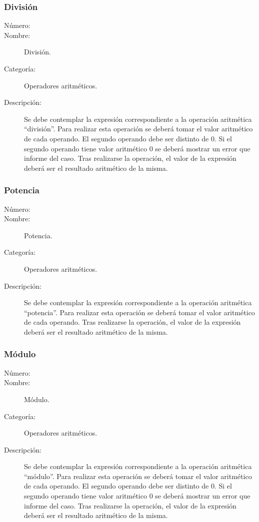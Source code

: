 \subsubsection{División}
	\begin{description}
		\item [Número:] \cn
		\item [Nombre:] División.
		\item [Categoría:] Operadores aritméticos.
		\item [Descripción:] Se debe contemplar la expresión correspondiente a la operación aritmética ``división''. Para realizar
		esta operación se deberá tomar el valor aritmético de cada operando. El segundo operando debe ser
		distinto de 0. Si el segundo operando tiene valor aritmético 0 se deberá mostrar un error que informe del caso.
		Tras realizarse la operación, el valor de la expresión
		deberá ser el resultado aritmético de la misma.
	\end {description}

\subsubsection{Potencia}
	\begin{description}
		\item [Número:] \cn
		\item [Nombre:] Potencia.
		\item [Categoría:] Operadores aritméticos.
		\item [Descripción:] Se debe contemplar la expresión correspondiente a la operación aritmética ``potencia''. Para realizar
		esta operación se deberá tomar el valor aritmético de cada operando. Tras realizarse la operación, el valor de la expresión
		deberá ser el resultado aritmético de la misma.
	\end {description}

\subsubsection{Módulo}
	\begin{description}
		\item [Número:] \cn
		\item [Nombre:] Módulo.
		\item [Categoría:] Operadores aritméticos.
		\item [Descripción:] Se debe contemplar la expresión correspondiente a la operación aritmética ``módulo''. Para realizar
		esta operación se deberá tomar el valor aritmético de cada operando. El segundo operando debe ser
		distinto de 0. Si el segundo operando tiene valor aritmético 0 se deberá mostrar un error que informe del caso.
		Tras realizarse la operación, el valor de la expresión deberá ser el resultado aritmético de la misma.
	\end {description}

